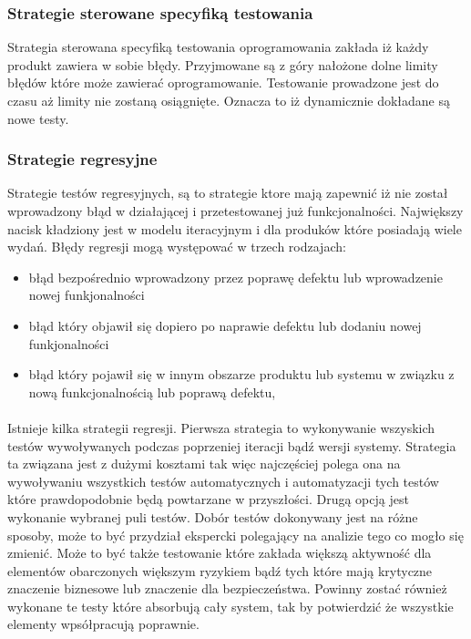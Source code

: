 \subsubsection{Strategie sterowane specyfiką testowania}
Strategia sterowana specyfiką testowania oprogramowania zakłada iż każdy produkt zawiera w sobie błędy. Przyjmowane są z góry nałożone dolne limity błędów które może zawierać oprogramowanie. Testowanie prowadzone jest do czasu aż limity nie zostaną osiągnięte. Oznacza to iż dynamicznie dokładane są nowe testy.
\subsubsection{Strategie regresyjne}
Strategie testów regresyjnych, są to strategie ktore mają zapewnić iż nie został wprowadzony błąd w działającej i przetestowanej już funkcjonalności. Największy nacisk kładziony jest w modelu iteracyjnym i dla produków które posiadają wiele wydań. Błędy regresji mogą występować w trzech rodzajach:
\begin{itemize}
  \item błąd bezpośrednio wprowadzony przez poprawę defektu lub wprowadzenie nowej funkjonalności
  \item błąd który objawił się dopiero po naprawie defektu lub dodaniu nowej funkjonalności
  \item  błąd który pojawił się w innym obszarze produktu lub systemu w związku z nową funkcjonalnością lub poprawą defektu,
\end{itemize}

\paragraph{}
Istnieje kilka strategii regresji. Pierwsza strategia to wykonywanie wszyskich testów wywoływanych podczas poprzeniej iteracji bądź wersji systemy. Strategia ta związana jest z dużymi kosztami tak więc najczęściej polega ona na wywoływaniu wszystkich testów automatycznych i automatyzacji tych testów które prawdopodobnie będą powtarzane w przyszłości. Drugą opcją jest wykonanie wybranej puli testów. Dobór testów dokonywany jest na różne sposoby, może to być przydział ekspercki polegający na analizie tego co mogło się zmienić. Może to być także testowanie które zakłada większą aktywność dla elementów obarczonych większym ryzykiem bądź tych które mają krytyczne znaczenie biznesowe lub znaczenie dla bezpieczeństwa. Powinny zostać również wykonane te testy które absorbują cały system, tak by potwierdzić że wszystkie elementy wpsółpracują poprawnie.

